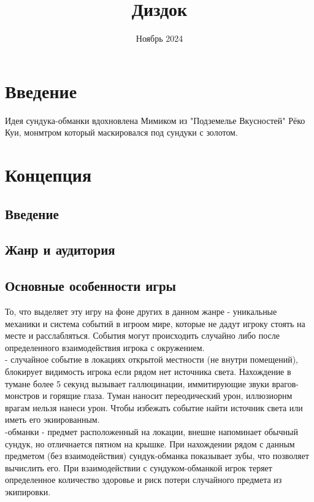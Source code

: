 \documentclass{article}
\title{Диздок}
\author{}
\date{Ноябрь 2024}
\begin{document}
\maketitle

\tableofcontents

\section{Введение}
Идея сундука-обманки вдохновлена Мимиком из "Подземелье Вкусностей" Рёко Куи, монмтром который маскировался под сундуки с золотом.

\section{Концепция}

\subsection{Введение}

\subsection{Жанр и аудитория}

\subsection{Основные особенности игры}
То, что выделяет эту игру на фоне других в данном жанре - уникальные механики и система событий в игроом мире, которые не дадут игроку стоять на месте и расслабляться. События могут происходить случайно либо после определенного взаимодействия игрока с окружением. \\[2mm]  - случайное событие в локациях открытой местности (не внутри помещений), блокирует видимость игрока если рядом нет источника света. Нахождение в тумане более 5 секунд вызывает галлюцинации, иммитирующие звуки врагов-монстров и горящие глаза. Туман наносит переодический урон, иллюзиорнм врагам нельзя нанеси урон. Чтобы избежать событие найти источник света или иметь его экиированным. \\[2mm] -обманки - предмет расположенный на локации, внешне напоминает обычный сундук, но отличнается пятном на крышке. При нахождении рядом с данным предметом (без взаимодействия) сундук-обманка показывает зубы, что позволяет вычислить его. При взаимодействии с сундуком-обманкой игрок теряет определенное количество здоровье и риск потери случайного предмета из экипировки. \\[2mm] 
\end{document}
